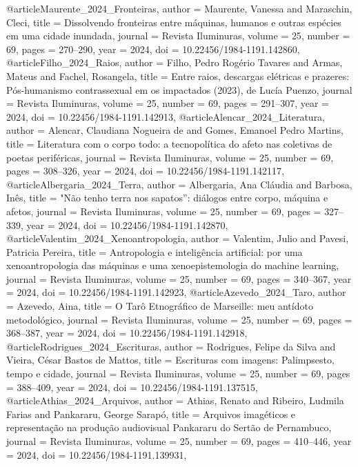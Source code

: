 @article{Maurente_2024_Fronteiras,
  author  = {Maurente, Vanessa and Maraschin, Cleci},
  title   = {Dissolvendo fronteiras entre máquinas, humanos e outras espécies em uma cidade inundada},
  journal = {Revista Iluminuras},
  volume  = {25},
  number  = {69},
  pages   = {270--290},
  year    = {2024},
  doi     = {10.22456/1984-1191.142860},
}
@article{Filho_2024_Raios,
  author  = {Filho, Pedro Rogério Tavares and Armas, Mateus and Fachel, Rosangela},
  title   = {Entre raios, descargas elétricas e prazeres: Pós-humanismo contrassexual em os impactados (2023), de Lucía Puenzo},
  journal = {Revista Iluminuras},
  volume  = {25},
  number  = {69},
  pages   = {291--307},
  year    = {2024},
  doi     = {10.22456/1984-1191.142913},
}
@article{Alencar_2024_Literatura,
  author  = {Alencar, Claudiana Nogueira de and Gomes, Emanoel Pedro Martins},
  title   = {Literatura com o corpo todo: a tecnopolítica do afeto nas coletivas de poetas periféricas},
  journal = {Revista Iluminuras},
  volume  = {25},
  number  = {69},
  pages   = {308--326},
  year    = {2024},
  doi     = {10.22456/1984-1191.142117},
}
@article{Albergaria_2024_Terra,
  author  = {Albergaria, Ana Cláudia and Barbosa, Inês},
  title   = {"Não tenho terra nos sapatos”: diálogos entre corpo, máquina e afetos},
  journal = {Revista Iluminuras},
  volume  = {25},
  number  = {69},
  pages   = {327--339},
  year    = {2024},
  doi     = {10.22456/1984-1191.142870},
}
@article{Valentim_2024_Xenoantropologia,
  author  = {Valentim, Julio and Pavesi, Patricia Pereira},
  title   = {Antropologia e inteligência artificial: por uma xenoantropologia das máquinas e uma xenoepistemologia do machine learning},
  journal = {Revista Iluminuras},
  volume  = {25},
  number  = {69},
  pages   = {340--367},
  year    = {2024},
  doi     = {10.22456/1984-1191.142923},
}
@article{Azevedo_2024_Taro,
  author  = {Azevedo, Aina},
  title   = {O Tarô Etnográfico de Marseille: meu antídoto metodológico},
  journal = {Revista Iluminuras},
  volume  = {25},
  number  = {69},
  pages   = {368--387},
  year    = {2024},
  doi     = {10.22456/1984-1191.142918},
}
@article{Rodrigues_2024_Escrituras,
  author  = {Rodrigues, Felipe da Silva and Vieira, César Bastos de Mattos},
  title   = {Escrituras com imagens: Palimpsesto, tempo e cidade},
  journal = {Revista Iluminuras},
  volume  = {25},
  number  = {69},
  pages   = {388--409},
  year    = {2024},
  doi     = {10.22456/1984-1191.137515},
}
@article{Athias_2024_Arquivos,
  author  = {Athias, Renato and Ribeiro, Ludmila Farias and Pankararu, George Sarapó},
  title   = {Arquivos imagéticos e representação na produção audiovisual Pankararu do Sertão de Pernambuco},
  journal = {Revista Iluminuras},
  volume  = {25},
  number  = {69},
  pages   = {410--446},
  year    = {2024},
  doi     = {10.22456/1984-1191.139931},
}
